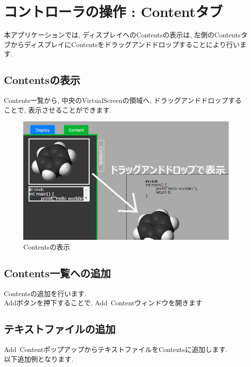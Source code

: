 \documentclass[a4paper,10pt,oneside]{jsbook}
\begin{document}
\section{コントローラの操作 : Contentタブ}
本アプリケーションでは, ディスプレイへのContentsの表示は, 左側のContentsタブからディスプレイにContentsをドラッグアンドドロップすることにより行います.

\subsection{Contentsの表示}
Contents一覧から, 中央のVirtualScreenの領域へ, ドラッグアンドドロップすることで, 表示させることができます.\\

\begin{figure}[htbp]
	\begin{center}
		\includegraphics[width=11.5cm]{image/DragAndDropContent.png}
	\end{center}
	\caption{Contentsの表示}
	\label{fig:draganddropcontent}
\end{figure}

\subsection{Contents一覧への追加}
Contentsの追加を行います.\\
Addボタンを押下することで, Add\ Contentウィンドウを開きます



\subsection{テキストファイルの追加}
Add\ ContentポップアップからテキストファイルをContentsに追加します.\\
以下追加例となります.\\
\end{document}
